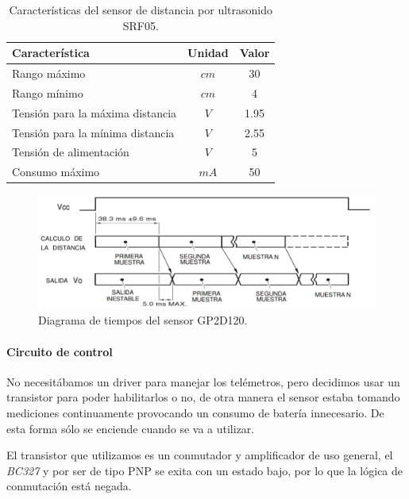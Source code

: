 \begin{table}[h]
	\begin{center}
		\begin{tabular}{|l|c|c|}
			\hline
			Caracter\'istica & Unidad & Valor\\
			\hline
			Rango m\'aximo & $cm$ & 30 \\
			Rango m\'inimo & $cm$ & 4 \\
			Tensi\'on para la m\'axima distancia & $V$ & 1.95 \\
			Tensi\'on para la m\'inima distancia & $V$ & 2.55 \\
			Tensi\'on de alimentaci\'on & $V$ & 5 \\
			Consumo m\'aximo & $mA$ & 50 \\
			\hline
		\end{tabular}
	\end{center}
	\caption{Caracter\'isticas del sensor de distancia por ultrasonido SRF05.}
	\label{hT_gp2d120}
\end{table}

\begin{figure}[h]
	\centering
	\includegraphics[scale=0.25]{figuras/gp2d120_pulse.png}
	\caption{Diagrama de tiempos del sensor GP2D120.}
	\label{hF_gp2d120_pulse}
\end{figure}

\paragraph{Circuito de control}
\label{h_sensado_telemetros_circuito}

No necesit\'abamos un driver para manejar los tel\'emetros, pero decidimos usar un transistor para poder habilitarlos o no,
de otra manera el sensor estaba tomando mediciones continuamente provocando un consumo de bater\'ia innecesario.
De esta forma s\'olo se enciende cuando se va a utilizar.

El transistor que utilizamos es un conmutador y amplificador de uso general, el \emph{BC327} y por ser de tipo PNP se
exita con un estado bajo, por lo que la l\'ogica de conmutaci\'on est\'a negada.

